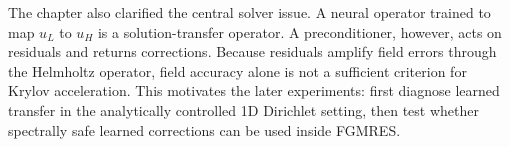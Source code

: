 The chapter also clarified the central solver issue. A neural operator trained
to map $u_L$ to $u_H$ is a solution-transfer operator. A preconditioner,
however, acts on residuals and returns corrections. Because residuals amplify
field errors through the Helmholtz operator, field accuracy alone is not a
sufficient criterion for Krylov acceleration. This motivates the later
experiments: first diagnose learned transfer in the analytically controlled 1D
Dirichlet setting, then test whether spectrally safe learned corrections can be
used inside FGMRES.

%
%
%
%
%
%
%
